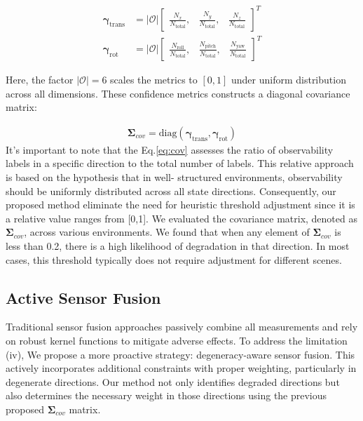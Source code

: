 \begin{align}
\boldsymbol{\gamma}_{\text{trans}} &= {|\mathcal{O}|} \begin{bmatrix}
\frac{N_x}{N_{\text{total}}}, & 
\frac{N_y}{N_{\text{total}}}, & 
\frac{N_z}{N_{\text{total}}}
\end{bmatrix}^T \\
\boldsymbol{\gamma}_{\text{rot}} &= {|\mathcal{O}|} \begin{bmatrix}
\frac{N_{\text{roll}}}{N_{\text{total}}}, & 
\frac{N_{\text{pitch}}}{N_{\text{total}}}, & 
\frac{N_{\text{yaw}}}{N_{\text{total}}}
\end{bmatrix}^T
\end{align}

Here, the factor ${|\mathcal{O}|} = 6$ scales the metrics to $[0,1]$ under uniform distribution across all dimensions. 
These confidence metrics constructs a diagonal covariance matrix:

\begin{align}
\boldsymbol{\Sigma}_{cov} = \text{diag}(\boldsymbol{\gamma}_{\text{trans}}, \boldsymbol{\gamma}_{\text{rot}})
\label{eq:cov}
\end{align}
 It’s important to note that
the Eq.\ref{eq:cov} assesses the ratio of observability labels in
a specific direction to the total number of labels. This
relative approach is based on the hypothesis that in well-
structured environments, observability should be uniformly
distributed across all state directions. Consequently, our
proposed method eliminate the need for heuristic threshold adjustment since it is a relative value ranges from [0,1]. We evaluated the covariance matrix, denoted as $\boldsymbol{\Sigma}_{cov}$, across various environments. We found that when any element of $\boldsymbol{\Sigma}_{cov}$ is less than 0.2, there is a high likelihood of degradation in that direction. In most cases, this threshold typically does not require adjustment for different scenes.


\subsection{Active Sensor Fusion}    
Traditional sensor fusion approaches passively combine all measurements and rely on robust kernel functions to mitigate adverse effects\cite{chebrolu2021adaptive}. To address the limitation (iv), We propose a more proactive strategy: degeneracy-aware sensor fusion. This actively incorporates additional constraints with proper weighting, particularly in degenerate directions. Our method not only identifies degraded directions but also determines the necessary weight in those directions using the previous proposed $\boldsymbol{\Sigma}_{cov}$ matrix. 

